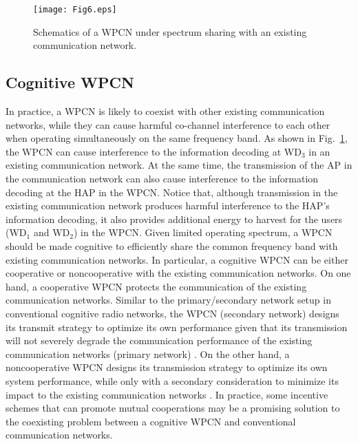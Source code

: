 \documentclass[journal, draftcls, one column, 12pt]{IEEEtran}
\begin{document}
\begin{figure}
\centering
  \begin{center}
    \texttt{[image: Fig6.eps]}
  \end{center}
  \caption{Schematics of a WPCN under spectrum sharing with an existing communication network.}
  \label{76}
\end{figure}

\subsection{Cognitive WPCN}
In practice, a WPCN is likely to coexist with other existing communication networks, while they can cause harmful co-channel interference to each other when operating simultaneously on the same frequency band. As shown in Fig.~\ref{76}, the WPCN can cause interference to the information decoding at WD$_3$ in an existing communication network. At the same time, the transmission of the AP in the communication network can also cause interference to the information decoding at the HAP in the WPCN. Notice that, although transmission in the existing communication network produces harmful interference to the HAP's information decoding, it also provides additional energy to harvest for the users (WD$_1$ and WD$_2$) in the WPCN. Given limited operating spectrum, a WPCN should be made cognitive to efficiently share the common frequency band with existing communication networks. In particular, a cognitive WPCN can be either cooperative or noncooperative with the existing communication networks. On one hand, a cooperative WPCN protects the communication of the existing communication networks. Similar to the primary/secondary network setup in conventional cognitive radio networks, the WPCN (secondary network) designs its transmit strategy to optimize its own performance given that its transmission will not severely degrade the communication performance of the existing communication networks (primary network) \cite{2015:Lee}. On the other hand, a noncooperative WPCN designs its transmission strategy to optimize its own system performance, while only with a secondary consideration to minimize its impact to the existing communication networks \cite{2015:Xu}. In practice, some incentive schemes that can promote mutual cooperations may be a promising solution to the coexisting problem between a cognitive WPCN and conventional communication networks.
\end{document}
